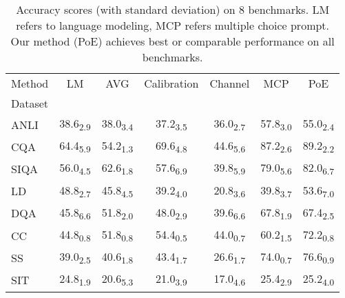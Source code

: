\begin{table}[h]
\centering
\caption{Accuracy scores (with standard deviation) on 8 benchmarks. LM refers to language modeling, MCP refers multiple choice prompt. Our method (PoE) achieves best or comparable performance on all benchmarks.}
\label{tab:main_exp}
\begin{tabular}{l|c|c|c|c|c|c}
Method & LM & AVG & Calibration & Channel & MCP & PoE \\
Dataset &  &  &  &  &  &  \\
ANLI & 38.6\textsubscript{2.9} & 38.0\textsubscript{3.4} & 37.2\textsubscript{3.5} & 36.0\textsubscript{2.7} & 57.8\textsubscript{3.0} & 55.0\textsubscript{2.4} \\
CQA & 64.4\textsubscript{5.9} & 54.2\textsubscript{1.3} & 69.6\textsubscript{4.8} & 44.6\textsubscript{5.6} & 87.2\textsubscript{2.6} & 89.2\textsubscript{2.2} \\
SIQA & 56.0\textsubscript{4.5} & 62.6\textsubscript{1.8} & 57.6\textsubscript{6.9} & 39.8\textsubscript{5.9} & 79.0\textsubscript{5.6} & 82.0\textsubscript{6.7} \\
LD & 48.8\textsubscript{2.7} & 45.8\textsubscript{4.5} & 39.2\textsubscript{4.0} & 20.8\textsubscript{3.6} & 39.8\textsubscript{3.7} & 53.6\textsubscript{7.0} \\
DQA & 45.8\textsubscript{6.6} & 51.8\textsubscript{2.0} & 48.0\textsubscript{2.9} & 39.6\textsubscript{6.6} & 67.8\textsubscript{1.9} & 67.4\textsubscript{2.5} \\
CC & 44.8\textsubscript{0.8} & 51.8\textsubscript{0.8} & 54.4\textsubscript{0.5} & 44.0\textsubscript{0.7} & 60.2\textsubscript{1.5} & 72.2\textsubscript{0.8} \\
SS & 39.0\textsubscript{2.5} & 40.6\textsubscript{1.8} & 43.4\textsubscript{1.7} & 26.6\textsubscript{1.7} & 74.0\textsubscript{0.7} & 76.6\textsubscript{0.9} \\
SIT & 24.8\textsubscript{1.9} & 20.6\textsubscript{5.3} & 21.0\textsubscript{3.9} & 17.0\textsubscript{4.6} & 25.4\textsubscript{2.9} & 25.2\textsubscript{4.0} \\
\end{tabular}
\end{table}
